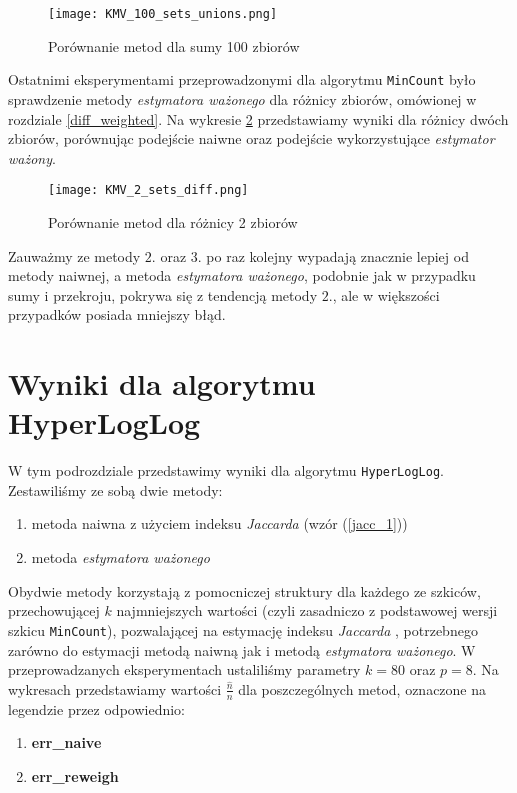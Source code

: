 \begin{figure}[h!]
    \texttt{[image: KMV\_100\_sets\_unions.png]}
    \centering
    \caption{Porównanie metod dla sumy 100 zbiorów}
    \label{fig:KMV_100sets_unions}
\end{figure}

Ostatnimi eksperymentami przeprowadzonymi dla algorytmu \texttt{MinCount} było sprawdzenie metody \textit{estymatora ważonego} dla różnicy zbiorów, omówionej w rozdziale \ref{diff_weighted}. Na wykresie \ref{fig:KMV_2_sets_diff} przedstawiamy wyniki dla różnicy dwóch zbiorów, porównując podejście naiwne oraz podejście wykorzystujące \textit{estymator ważony}.

\begin{figure}[h!]
    \texttt{[image: KMV\_2\_sets\_diff.png]}
    \centering
    \caption{Porównanie metod dla różnicy 2 zbiorów}
    \label{fig:KMV_2_sets_diff}
\end{figure}

Zauważmy ze metody $2.$ oraz $3.$ po raz kolejny wypadają znacznie lepiej od metody naiwnej, a metoda \textit{estymatora ważonego}, podobnie jak w przypadku sumy i przekroju, pokrywa się z tendencją metody $2.$, ale w większości przypadków posiada mniejszy błąd.

\newpage
\section{Wyniki dla algorytmu HyperLogLog}
W tym podrozdziale przedstawimy wyniki dla algorytmu \texttt{HyperLogLog}. Zestawiliśmy ze sobą dwie metody:
\begin{enumerate}
	\item metoda naiwna z użyciem indeksu \textit{Jaccarda} (wzór (\ref{jacc_1}))
	\item metoda \textit{estymatora ważonego}
\end{enumerate}
Obydwie metody korzystają z pomocniczej struktury dla każdego ze szkiców, przechowującej $k$ najmniejszych wartości (czyli zasadniczo z podstawowej wersji szkicu \texttt{MinCount}), pozwalającej na estymację indeksu \textit{Jaccarda} \cite{adroll}, potrzebnego zarówno do estymacji metodą naiwną jak i metodą \textit{estymatora ważonego}. W przeprowadzanych eksperymentach ustaliliśmy parametry $k = 80$ oraz $p = 8$.
Na wykresach przedstawiamy wartości $\frac{\hat{n}}{n}$ dla poszczególnych metod, oznaczone na legendzie przez odpowiednio:
\begin{enumerate}
	\item \textbf{err\_naive}
	\item \textbf{err\_reweigh}
\end{enumerate}

